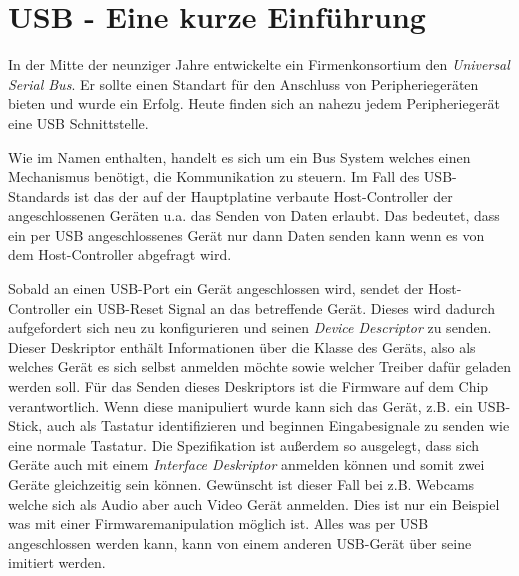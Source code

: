 \section{USB - Eine kurze Einführung}
In der Mitte der neunziger Jahre entwickelte ein Firmenkonsortium den \textit{Universal Serial Bus}.
Er sollte einen Standart für den Anschluss von Peripheriegeräten bieten und wurde ein Erfolg.
Heute finden sich an nahezu jedem Peripheriegerät eine USB Schnittstelle.

Wie im Namen enthalten, handelt es sich um ein Bus System welches einen Mechanismus benötigt, die Kommunikation zu steuern.
Im Fall des USB-Standards ist das der auf der Hauptplatine verbaute Host-Controller der angeschlossenen Geräten u.a. das Senden von Daten erlaubt.
Das bedeutet, dass ein per USB angeschlossenes Gerät nur dann Daten senden kann wenn es von dem Host-Controller abgefragt wird.

Sobald an einen USB-Port ein Gerät angeschlossen wird, sendet der Host-Controller ein USB-Reset Signal an das betreffende Gerät.
Dieses wird dadurch aufgefordert sich neu zu konfigurieren und seinen \textit{Device Descriptor} zu senden.
Dieser Deskriptor enthält Informationen über die Klasse des Geräts, also als welches Gerät es sich selbst anmelden möchte sowie welcher Treiber dafür geladen werden soll.
Für das Senden dieses Deskriptors ist die Firmware auf dem Chip verantwortlich.
Wenn diese manipuliert wurde kann sich das Gerät, z.B. ein USB-Stick, auch als Tastatur identifizieren und beginnen Eingabesignale zu senden wie eine normale Tastatur.
Die Spezifikation ist außerdem so ausgelegt, dass sich Geräte auch mit einem \textit{Interface Deskriptor} anmelden können und somit zwei Geräte gleichzeitig sein können.
Gewünscht ist dieser Fall bei z.B. Webcams welche sich als Audio aber auch Video Gerät anmelden.
Dies ist nur ein Beispiel was mit einer Firmwaremanipulation möglich ist.
Alles was per USB angeschlossen werden kann, kann von einem anderen USB-Gerät über seine imitiert werden.
